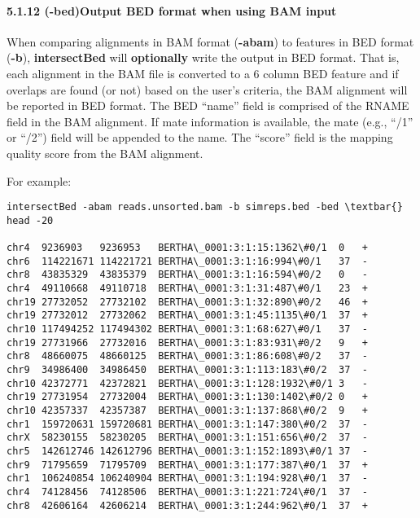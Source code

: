 \documentclass[letterpaper,10pt,english]{sphinxmanual}
\begin{document}
\paragraph{5.1.12 (-bed)Output BED format when using BAM input}
\label{content/intersectBed:bed-output-bed-format-when-using-bam-input}
When comparing alignments in BAM format (\textbf{-abam}) to features in BED format (\textbf{-b}), \textbf{intersectBed}
will \textbf{optionally} write the output in BED format. That is, each alignment in the BAM file is converted
to a 6 column BED feature and if overlaps are found (or not) based on the user's criteria, the BAM
alignment will be reported in BED format. The BED ``name'' field is comprised of the RNAME field in
the BAM alignment. If mate information is available, the mate (e.g., ``/1'' or ``/2'') field will be
appended to the name. The ``score'' field is the mapping quality score from the BAM alignment.

For example:

\begin{Verbatim}[commandchars=\\\{\}]
intersectBed -abam reads.unsorted.bam -b simreps.bed -bed \textbar{} head -20

chr4  9236903   9236953   BERTHA\_0001:3:1:15:1362\#0/1  0   +
chr6  114221671 114221721 BERTHA\_0001:3:1:16:994\#0/1   37  -
chr8  43835329  43835379  BERTHA\_0001:3:1:16:594\#0/2   0   -
chr4  49110668  49110718  BERTHA\_0001:3:1:31:487\#0/1   23  +
chr19 27732052  27732102  BERTHA\_0001:3:1:32:890\#0/2   46  +
chr19 27732012  27732062  BERTHA\_0001:3:1:45:1135\#0/1  37  +
chr10 117494252 117494302 BERTHA\_0001:3:1:68:627\#0/1   37  -
chr19 27731966  27732016  BERTHA\_0001:3:1:83:931\#0/2   9   +
chr8  48660075  48660125  BERTHA\_0001:3:1:86:608\#0/2   37  -
chr9  34986400  34986450  BERTHA\_0001:3:1:113:183\#0/2  37  -
chr10 42372771  42372821  BERTHA\_0001:3:1:128:1932\#0/1 3   -
chr19 27731954  27732004  BERTHA\_0001:3:1:130:1402\#0/2 0   +
chr10 42357337  42357387  BERTHA\_0001:3:1:137:868\#0/2  9   +
chr1  159720631 159720681 BERTHA\_0001:3:1:147:380\#0/2  37  -
chrX  58230155  58230205  BERTHA\_0001:3:1:151:656\#0/2  37  -
chr5  142612746 142612796 BERTHA\_0001:3:1:152:1893\#0/1 37  -
chr9  71795659  71795709  BERTHA\_0001:3:1:177:387\#0/1  37  +
chr1  106240854 106240904 BERTHA\_0001:3:1:194:928\#0/1  37  -
chr4  74128456  74128506  BERTHA\_0001:3:1:221:724\#0/1  37  -
chr8  42606164  42606214  BERTHA\_0001:3:1:244:962\#0/1  37  +
\end{Verbatim}
\end{document}
